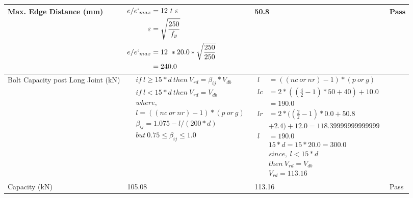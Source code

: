 \documentclass{article}%
\begin{document}
\begin{longtable}{|p{4cm}|p{5cm}|p{5.5cm}|p{1.5cm}|}
\hline%
Max. Edge Distance (mm)&$\begin{aligned}e/e`_{max} &= 12~ t~ \varepsilon&\\ \varepsilon &= \sqrt{\frac{250}{f_y}}\\ e/e`_{max}&=12 ~*20.0*\sqrt{\frac{250}{250}}\\ &=240.0\\ \end{aligned}$&50.8&Pass\\%
\hline%
Bolt Capacity post Long Joint (kN)&$\begin{aligned} &if~l\geq 15 * d~then~V_{rd} = \beta_{ij} * V_{db} \\ & if~l < 15 * d~then~V_{rd} = V_{db} \\ & where,\\ & l = ((nc~or~nr) - 1) * (p~or~g) \\ & \beta_{ij} = 1.075 - l/(200 * d) \\ & but~0.75\leq\beta_{ij}\leq1.0 \end{aligned}$&$\begin{aligned} l~&= ((nc~or~nr) - 1) * (p~or~g) \\  lc&= 2*((\frac{4}{2} - 1) * 50+40)+ 10.0\\&=190.0\\  lr&= 2*((\frac{2}{2} - 1) * 0.0+50.8\\& +2.4)+ 12.0=118.39999999999999\\  l~&= 190.0\\ & 15 * d = 15 * 20.0 = 300.0 \\ & since,~l < 15 * d~ \\& then~V_{rd} = V_{db} \\ & V_{rd} = 113.16 \end{aligned}$&\\%
\hline%
Capacity (kN)&105.08&113.16&Pass\\%
\hline%
\end{longtable}

%
\newpage%
\end{document}

